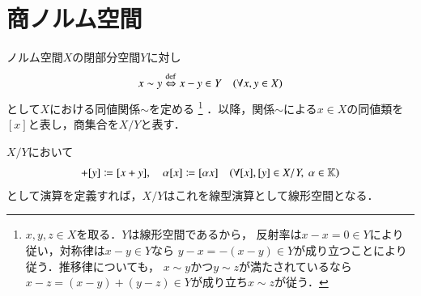 \section{商ノルム空間}
\label{sec:quotient_normed_space}
	ノルム空間$X$の閉部分空間$Y$に対し
	\begin{align}
		x \sim y \overset{\mathrm{def}}{\Leftrightarrow} x - y \in Y \quad (\forall x,y \in X)
	\end{align}
	として$X$における同値関係$\sim$を定める
	\footnote{
		$x,y,z \in X$を取る．$Y$は線形空間であるから，
		反射率は$x - x = 0 \in Y$により従い，対称律は$x - y \in Y$なら
		$y - x = -(x - y) \in Y$が成り立つことにより従う．推移律についても，
		$x \sim y$かつ$y \sim z$が満たされているなら
		$x - z = (x - y) + (y - z) \in Y$が成り立ち$x \sim z$が従う．
	}
	．以降，関係$\sim$による$x \in X$の同値類を$[x]$と表し，商集合を$X/Y$と表す．
	
	\begin{screen}
		\begin{thm}[商集合における線型演算]
			$X/Y$において
			\begin{align}
				[x] + [y] \coloneqq [x + y], \quad
				\alpha [x] \coloneqq [\alpha x] \quad (\forall [x],[y] \in X/Y,\ \alpha \in \K)
				\label{eq:quotient_set_linear_calculation_1}
			\end{align}
			として演算を定義すれば，$X/Y$はこれを線型演算として線形空間となる．
		\end{thm}
	\end{screen}
	
